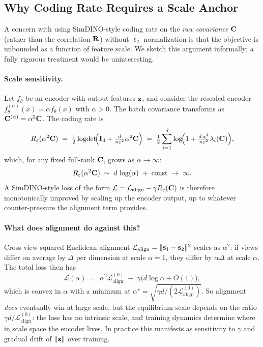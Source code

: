 \subsection{Why Coding Rate Requires a Scale Anchor}
\label{sec:coding_rate_scale}

A concern with using SimDINO-style coding rate on the \emph{raw covariance} $\mathbf{C}$ (rather than the correlation $\mathbf{R}$) without $\ell_2$ normalization is that the objective is unbounded as a function of feature scale. We sketch this argument informally; a fully rigorous treatment would be uninteresting.

\paragraph{Scale sensitivity.}
Let $f_\theta$ be an encoder with output features $\mathbf{z}$, and consider the rescaled encoder $f_\theta^{(\alpha)}(x) = \alpha f_\theta(x)$ with $\alpha > 0$. The batch covariance transforms as $\mathbf{C}^{(\alpha)} = \alpha^2 \mathbf{C}$. The coding rate is
\begin{align}
    R_\varepsilon(\alpha^2 \mathbf{C}) \;=\; \tfrac{1}{2}\operatorname{logdet}\!\Bigl(\mathbf{I}_d + \tfrac{d}{n\varepsilon^2}\alpha^2 \mathbf{C}\Bigr)
    \;=\; \tfrac{1}{2}\sum_{i=1}^{d} \log\!\Bigl(1 + \tfrac{d\,\alpha^2}{n\varepsilon^2}\lambda_i(\mathbf{C})\Bigr),
\end{align}
which, for any fixed full-rank $\mathbf{C}$, grows as $\alpha \to \infty$:
\begin{equation}
    R_\varepsilon(\alpha^2 \mathbf{C}) \;\sim\; d\,\log(\alpha) \;+\; \text{const} \;\to\; \infty.
\end{equation}
A SimDINO-style loss of the form $\mathcal{L} = \mathcal{L}_\text{align} - \gamma R_\varepsilon(\mathbf{C})$ is therefore monotonically improved by scaling up the encoder output, up to whatever counter-pressure the alignment term provides.

\paragraph{What does alignment do against this?}
Cross-view squared-Euclidean alignment $\mathcal{L}_\text{align} = \|\mathbf{s}_1 - \mathbf{s}_2\|^2$ scales as $\alpha^2$: if views differ on average by $\Delta$ per dimension at scale $\alpha = 1$, they differ by $\alpha\Delta$ at scale $\alpha$. The total loss then has
\begin{equation}
    \mathcal{L}(\alpha) \;=\; \alpha^2 \mathcal{L}_\text{align}^{(0)} \;-\; \gamma\bigl(d\log\alpha + O(1)\bigr),
\end{equation}
which is convex in $\alpha$ with a minimum at $\alpha^\star = \sqrt{\gamma d / (2\mathcal{L}_\text{align}^{(0)})}$. So alignment \emph{does} eventually win at large scale, but the equilibrium scale depends on the ratio $\gamma d / \mathcal{L}_\text{align}^{(0)}$: the loss has no intrinsic scale, and training dynamics determine where in scale space the encoder lives. In practice this manifests as sensitivity to $\gamma$ and gradual drift of $\|\mathbf{z}\|$ over training.

